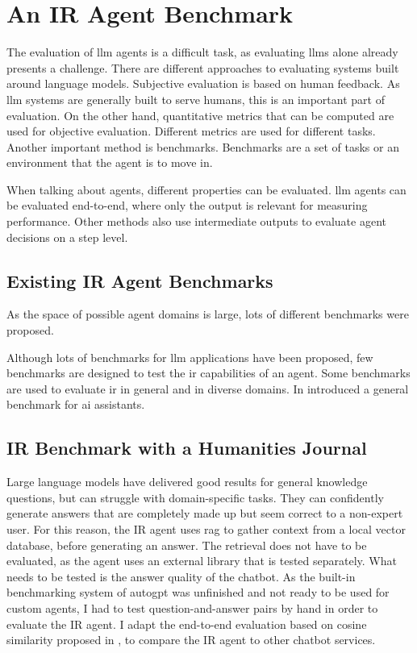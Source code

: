 \documentclass[../main.tex]{subfiles}
\begin{document}
\chapter{An IR Agent Benchmark}
\label{ch:benchmarks}

The evaluation of \gls{llm} agents is a difficult task,
as evaluating \glspl{llm} alone already presents a challenge.
There are different approaches to evaluating systems built around language models.
Subjective evaluation is based on human feedback.
As \gls{llm} systems are generally built to serve humans, this is an important part of evaluation.
On the other hand,
quantitative metrics that can be computed are used for objective evaluation.
Different metrics are used for different tasks. Another important method is benchmarks.
Benchmarks are a set of tasks or an environment that the agent is to move in.

When talking about agents, different properties can be evaluated.
\gls{llm} agents can be evaluated end-to-end, where only the output is
relevant for measuring performance.
Other methods also use intermediate outputs to evaluate agent decisions on a step level.

\section{Existing IR Agent Benchmarks}

As the space of possible agent domains is large, lots of different benchmarks were proposed.

Although lots of benchmarks for \gls{llm} applications have been proposed,
few benchmarks are designed to test the \gls{ir} capabilities of an agent.
Some benchmarks are used to evaluate \gls{ir} in general and in diverse domains. %
In \autocite{Mialon2023} introduced a general benchmark for \gls{ai} assistants.


\section{IR Benchmark with a Humanities Journal}

Large language models have delivered good results for general knowledge questions,
but can struggle with domain-specific tasks.
They can confidently generate answers that are completely made up but seem correct to a non-expert user.
For this reason, the IR agent uses \gls{rag} to gather context from a local vector database,
before generating an answer.
The retrieval does not have to be evaluated, as the agent uses an external library that is tested separately.
What needs to be tested is the answer quality of the chatbot.
As the built-in benchmarking system of \gls{autogpt} was unfinished and not ready to be used for custom agents,
I had to test question-and-answer pairs by hand in order to evaluate the IR agent.
I adapt the end-to-end evaluation based on cosine similarity proposed in \cite{Banerjee2023},
to compare the IR agent to other chatbot services.
\end{document}
